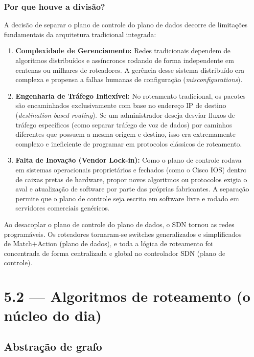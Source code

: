 \documentclass[11pt,a4paper]{article}
\begin{document}
\subsubsection{Por que houve a divisão?}
A decisão de separar o plano de controle do plano de dados decorre de limitações fundamentais da arquitetura tradicional integrada:
\begin{enumerate}
    \item \textbf{Complexidade de Gerenciamento:} Redes tradicionais dependem de algoritmos distribuídos e assíncronos rodando de forma independente em centenas ou milhares de roteadores. A gerência desse sistema distribuído era complexa e propensa a falhas humanas de configuração (\emph{misconfigurations}).
    \item \textbf{Engenharia de Tráfego Inflexível:} No roteamento tradicional, os pacotes são encaminhados exclusivamente com base no endereço IP de destino (\emph{destination-based routing}). Se um administrador deseja desviar fluxos de tráfego específicos (como separar tráfego de voz de dados) por caminhos diferentes que possuem a mesma origem e destino, isso era extremamente complexo e ineficiente de programar em protocolos clássicos de roteamento.
    \item \textbf{Falta de Inovação (Vendor Lock-in):} Como o plano de controle rodava em sistemas operacionais proprietários e fechados (como o Cisco IOS) dentro de caixas pretas de hardware, propor novos algoritmos ou protocolos exigia o aval e atualização de software por parte das próprias fabricantes. A separação permite que o plano de controle seja escrito em software livre e rodado em servidores comerciais genéricos.
\end{enumerate}

Ao desacoplar o plano de controle do plano de dados, o SDN tornou as redes programáveis. Os roteadores tornaram-se switches generalizados e simplificados de Match+Action (plano de dados), e toda a lógica de roteamento foi concentrada de forma centralizada e global no controlador SDN (plano de controle).

\hrulefill

\section{5.2 --- Algoritmos de roteamento (o núcleo do dia)}

\subsection{Abstração de grafo}
\end{document}

